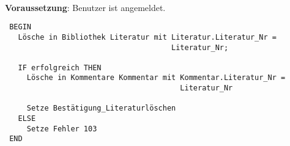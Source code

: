 \hrulefill\\
\textbf{Voraussetzung}: Benutzer ist angemeldet.
\begin{verbatim}
 BEGIN
   Lösche in Bibliothek Literatur mit Literatur.Literatur_Nr = 
                                      Literatur_Nr;

   IF erfolgreich THEN
     Lösche in Kommentare Kommentar mit Kommentar.Literatur_Nr = 
                                        Literatur_Nr

     Setze Bestätigung_Literaturlöschen
   ELSE
     Setze Fehler 103
 END
\end{verbatim}
\hrulefill